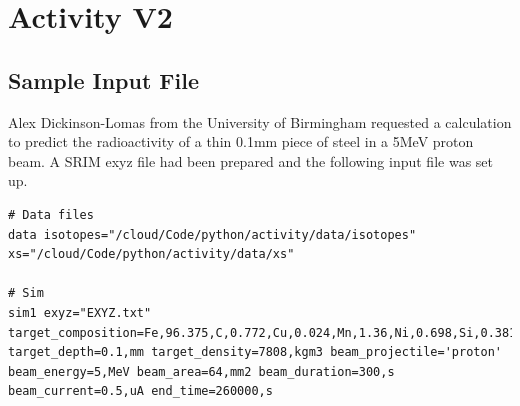 \chapter{Activity V2}

\section{Sample Input File}

Alex Dickinson-Lomas from the University of Birmingham requested a calculation to predict the radioactivity of a thin 0.1mm piece of steel in a 5MeV proton beam.  A SRIM exyz file had been prepared and the following input file was set up.

\begin{lstlisting}[style=sOutputFile,caption={Activity V2 Input File}]
# Data files
data isotopes="/cloud/Code/python/activity/data/isotopes" xs="/cloud/Code/python/activity/data/xs"

# Sim
sim1 exyz="EXYZ.txt" target_composition=Fe,96.375,C,0.772,Cu,0.024,Mn,1.36,Ni,0.698,Si,0.381,Cr,0.092,V,0.008,P,0.009,Si,0.003,Mo,0.278 target_depth=0.1,mm target_density=7808,kgm3 beam_projectile='proton' beam_energy=5,MeV beam_area=64,mm2 beam_duration=300,s beam_current=0.5,uA end_time=260000,s
\end{lstlisting}




